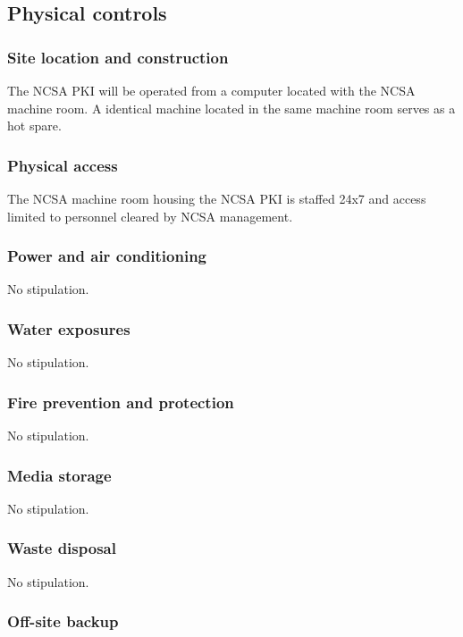 \documentclass[10pt]{article}
\begin{document}
\subsection{Physical controls}

\subsubsection{Site location and construction}

The NCSA PKI will be operated from a computer located with the NCSA
machine room. A identical machine located in the same machine room
serves as a hot spare.

\subsubsection{Physical access}

The NCSA machine room housing the NCSA PKI is staffed 24x7 and access
limited to personnel cleared by NCSA management.

\subsubsection{Power and air conditioning}

No stipulation.

\subsubsection{Water exposures}

No stipulation.

\subsubsection{Fire prevention and protection}

No stipulation.

\subsubsection{Media storage}

No stipulation.

\subsubsection{Waste disposal}

No stipulation.

\subsubsection{Off-site backup}
\end{document}

